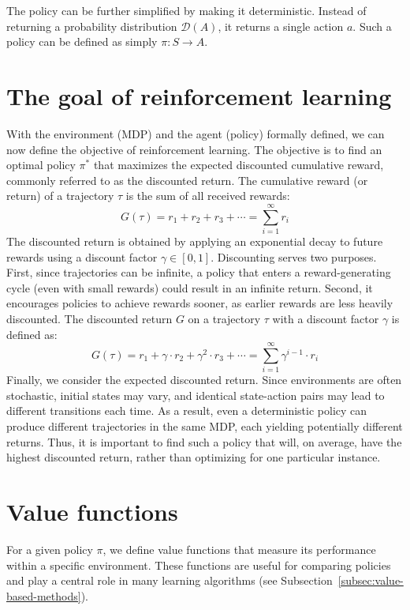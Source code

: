 \documentclass[
  digital,     %
  oneside,     %
  nosansbold,  %
  nocolorbold, %
  lof,         %
  lot,         %
]{fithesis4}
\begin{document}
The policy can be further simplified by making it deterministic. Instead of returning a probability distribution $\mathcal{D}(A)$, it returns a single action $a$. Such a policy can be defined as simply $\pi\colon S\to A$.

\section{The goal of reinforcement learning}
\label{sec:goal}
With the environment (MDP) and the agent (policy) formally defined, we can now define the objective of reinforcement learning. The objective is to find an optimal policy $\pi^*$ that maximizes the expected discounted cumulative reward, commonly referred to as the discounted return. The cumulative reward (or return) of a trajectory $\tau$ is the sum of all received rewards:
\begin{equation}
G(\tau) = r_1+r_2+r_3+\dotsb = \sum_{i=1}^{\infty} r_i
\end{equation}
The discounted return is obtained by applying an exponential decay to future rewards using a discount factor $\gamma \in [0,1]$. Discounting serves two purposes. First, since trajectories can be infinite, a policy that enters a reward-generating cycle (even with small rewards) could result in an infinite return. Second, it encourages policies to achieve rewards sooner, as earlier rewards are less heavily discounted. The discounted return $G$ on a trajectory $\tau$ with a discount factor $\gamma$ is defined as:
\begin{equation}
G(\tau)=r_1+\gamma \cdot r_2+ \gamma^2 \cdot r_3+\dotsb = \sum_{i=1}^{\infty} \gamma^{i-1}\cdot r_{i}
\end{equation}
Finally, we consider the expected discounted return. Since environments are often stochastic, initial states may vary, and identical state-action pairs may lead to different transitions each time. As a result, even a deterministic policy can produce different trajectories in the same MDP, each yielding potentially different returns. Thus, it is important to find such a policy that will, on average, have the highest discounted return, rather than optimizing for one particular instance.

\section{Value functions}

For a given policy $\pi$, we define value functions that measure its performance within a specific environment. These functions are useful for comparing policies and play a central role in many learning algorithms (see Subsection~\ref{subsec:value-based-methods}).
\end{document}
